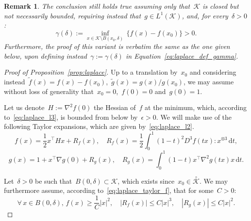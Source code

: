 \documentclass[10pt]{article}
\renewcommand{\d}{\mathrm{d}}
\newcommand{\1}{\mathbbm 1}
\newtheorem{remark}{Remark}
\begin{document}
        \begin{remark}
            The conclusion still holds true assuming only that~$\mathcal K$ is closed but not necessarily bounded, requiring instead that~$g\in L^1(\mathcal K)$, and, for every~$\delta >0$:
            \begin{equation}
                \gamma(\delta) := \underset{x\in \mathcal K \setminus B(x_0,\delta)}{\inf}\, \{f(x)-f(x_0)\}>0.
            \end{equation}
            Furthermore, the proof of this variant is verbatim the same as the one given below, upon defining instead~$\gamma := \gamma(\delta)$ in Equation~\eqref{eq:laplace_def_gamma}.
        \end{remark}
    
        \begin{proof}[Proof of Proposition~\ref{prop:laplace}]
            Up to a translation by~$x_0$ and considering instead~$\tilde f(x)=f(x)-f(x_0)$,~$\tilde g(x)=g(x)/g(x_0)$, we may assume without loss of generality that~$x_0=0$,~$f(0) = 0$ and~$g(0)=1$.

            Let us denote~$H := \nabla^2 f(0)$ the Hessian of~$f$ at the minimum, which, according to~\eqref{eq:laplace_l3}, is bounded from below by~$\epsilon>0$.
            We will make use of the following Taylor expansions, which are given by~\eqref{eq:laplace_l2}.
            \begin{equation}
                \label{eq:laplace_taylor_f}
                f(x) = \frac12 x^\intercal H x + R_f(x),\quad R_f(x) = \frac12\int_0^1 (1-t)^2 D^3 f(tx):x^{\otimes 3} \,\d t,
            \end{equation}
            \begin{equation}
                \label{eq:laplace_taylor_g}
                g(x) = 1 + x^\intercal \nabla g(0) + R_g(x),\quad R_g(x)=\int_0^1 (1-t) x^\intercal \nabla^2 g(tx)x\,\d t.
            \end{equation}


            Let~$\delta>0$ be such that~$B(0,\delta) \subset \mathcal K$, which exists since~$x_0\in\overset{\circ}{\mathcal K}$. We may furthermore assume, according to~\eqref{eq:laplace_taylor_f}, that for some~$C>0$:
            \begin{equation}
                \label{eq:laplace_f_minorization}
                \forall\,x\in B(0,\delta),\, f(x) \geq \frac1C |x|^2,\quad |R_f(x)| \leq C|x|^3,\quad |R_g(x)| \leq C|x|^2.
            \end{equation}
            

\end{proof}
\end{document}
